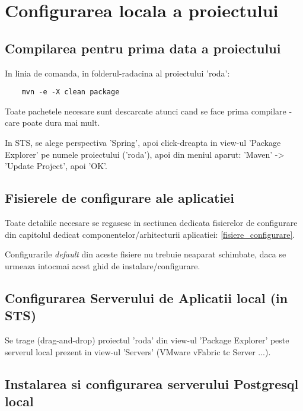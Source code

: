 \section{Configurarea locala a proiectului}
\subsection{Compilarea pentru prima data a proiectului}

In linia de comanda, in folderul-radacina al proiectului 'roda':
\begin{lstlisting}
	mvn -e -X clean package
\end{lstlisting}
Toate pachetele necesare sunt descarcate atunci cand se face prima compilare - care poate dura mai mult.

In STS, se alege perspectiva 'Spring', 
apoi click-dreapta in view-ul 'Package
Explorer' pe numele proiectului ('roda'), 
apoi din meniul aparut:
'Maven' -> 'Update Project', 
apoi 'OK'.


\subsection{Fisierele de configurare ale aplicatiei}
Toate detaliile necesare se regasesc in sectiunea
dedicata fisierelor de configurare din capitolul dedicat componentelor/arhitecturii aplicatiei: 
\ref{fisiere_configurare}.

Configurarile \emph{default} din aceste fisiere nu trebuie neaparat
schimbate, daca se urmeaza intocmai acest ghid de instalare/configurare.

\subsection{Configurarea Serverului de Aplicatii local (in STS)}
Se trage (drag-and-drop) proiectul 'roda' din view-ul 'Package Explorer' 
peste serverul local prezent in view-ul 'Servers' (VMware vFabric tc Server ...).


\subsection{Instalarea si configurarea serverului Postgresql local}
\label{postgresql_configurare}


